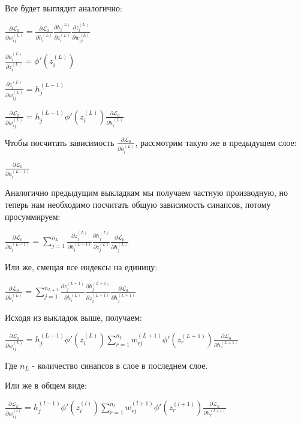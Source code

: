 \documentclass[12pt]{extarticle}
\begin{document}
	Все будет выглядит аналогично: 
	
	\centerline{$\frac{\partial \mathcal{L}_0}{\partial w_{ij}^{(L)}} = \frac{\partial \mathcal{L}_0}{\partial  h_i^{(L)}}\frac{\partial h_i^{(L)}}{\partial z_i^{(L)}}\frac{\partial z_i^{(L)}}{\partial w_{ij}^{(L)}}$}
	
	\centerline{$\frac{\partial h_i^{(L)}}{\partial z_i^{(L)}} = \phi'(z_i^{(L)})$}
	
	\centerline{$\frac{\partial z_i^{(L)}}{\partial w_{ij}^{(L)}} = h_j^{(L-1)}$}
	
	\centerline{$\frac{\partial \mathcal{L}_0}{\partial w_{ij}^{(L)}} = h_j^{(L-1)} \phi'(z_i^{(L)}) \frac{\partial \mathcal{L}_0}{\partial  h_i^{(L)}}$}
	
	Чтобы посчитать зависимость $\frac{\partial \mathcal{L}_0}{\partial  h_i^{(L)}}$, рассмотрим такую же в предыдущем слое:
	
	\centerline{$\frac{\partial \mathcal{L}_0}{\partial  h_i^{(L-1)}}$}
	
	Аналогично предыдущим выкладкам мы получаем частную производную, но теперь нам необходимо посчитать общую зависимость синапсов, потому просуммируем:
	
	\centerline{$\frac{\partial \mathcal{L}_0}{\partial  h_i^{(L-1)}} = \displaystyle \sum_{j = 1}^{n_L}\frac{\partial z_j^{(L)}}{\partial h_i^{(L-1)}}\frac{\partial h_j^{(L)}}{\partial z_j^{(L)}}\frac{\partial \mathcal{L}_0}{\partial  h_j^{(L)}} $}
	
	Или же, смещая все индексы на единицу:
	
	\centerline{$\frac{\partial \mathcal{L}_0}{\partial  h_i^{(L)}} = \displaystyle \sum_{j = 1}^{n_{L+1}}\frac{\partial z_j^{(L+1)}}{\partial h_i^{(L)}}\frac{\partial h_j^{(L+1)}}{\partial z_j^{(L+1)}}\frac{\partial \mathcal{L}_0}{\partial  h_j^{(L+1)}} $}
	
	
	Исходя из выкладок выше, получаем:
	
	\centerline{$\frac{\partial \mathcal{L}_0}{\partial w_{ij}^{(L)}} = h_j^{(L-1)} \phi'(z_i^{(L)}) \displaystyle \sum_{r=1}^{n_L}w_{rj}^{(L+1)}\phi '(z_r^{(L+1)})\frac{\partial \mathcal{L}_0}{\partial h_r^{(L+1)}}$}
	Где $n_L$ - количество синапсов в слое в последнем слое.
	
	Или же в общем виде:
	
	\centerline{$\frac{\partial \mathcal{L}_k}{\partial w_{ij}^{(l)}} = h_j^{(l-1)} \phi'(z_i^{(l)}) \displaystyle \sum_{r=1}^{n_l}w_{rj}^{(l+1)}\phi '(z_r^{(l+1)})\frac{\partial \mathcal{L}_k}{\partial h_r^{(l+1)}}$}
	
\end{document}
